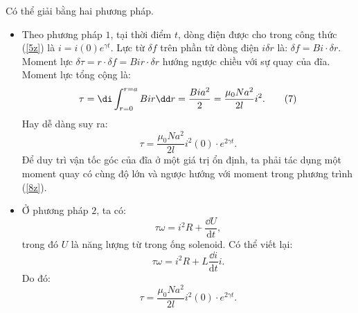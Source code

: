 \begin{loigiai}
\begin{enumerate}[1)]
\begin{center}
\begin{tikzpicture}[x=0.75pt,y=0.75pt,yscale=-1.2,xscale=1.2]
\end{tikzpicture}
\end{center}
Có thể giải bằng hai phương pháp.\\
\begin{itemize}
    \item Theo phương pháp $1$, tại thời điểm $t$, dòng điện được cho trong công thức (\ref{5z}) là $i=i(0) e^{\gamma t}$. Lực từ $\delta f$ trên phần tử dòng điện $i \delta r$ là: $\delta f=Bi \cdot \delta r$.\\
Moment lực $\delta \tau =r \cdot \delta f=B i r \cdot \delta r$ hướng ngược chiều với sự quay của đĩa. Moment lực tổng cộng là:
\[\tau = \di \int_{r=0}^{r=a} B i r \dd r = \dfrac{B i a^{2}}{2}=\dfrac{\mu_{0} N a^{2}}{2 l} i^{2}. \tag{7}\]
Hay dễ dàng suy ra:
\[\tau=\dfrac{\mu_{0} N a^{2}}{2 l} i^{2}(0) \cdot e^{2 \gamma t}. \tag{8} \label{8z}\]
Để duy trì vận tốc góc của đĩa ở một giá trị ổn định, ta phải tác dụng một moment quay có cùng độ lớn và ngược hướng với moment trong phương trình (\ref{8z}).
    \item Ở phương pháp $2$, ta có:
\[ \tau \omega =i^2 R + \dfrac{{\dd U}}{\mathrm{d} t}, \tag{9}\]
trong đó $U$ là năng lượng từ trong ống solenoid. Có thể viết lại:
\[ \tau \omega =i^2 R + L\dfrac{{\dd i}}{\mathrm{d}t }i. \tag{10}\]
Do đó:
\[\tau=\dfrac{\mu_{0} N a^{2}}{2 l} i^{2}(0) \cdot e^{2 \gamma t}. \tag{11}\]
\end{itemize}
\end{enumerate}
\end{loigiai}



